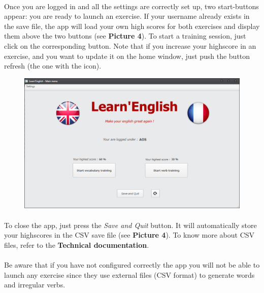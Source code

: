 \documentclass[12pt, a4paper]{report}
\begin{document}
\paragraph{}Once you are logged in and all the settings are correctly set up, two start-buttons appear: you are ready to launch an exercise. If your username already exists in the save file, the app will load your own high scores for both exercises and display them above the two buttons (see \textbf{Picture 4}). To start a training session, just click on the corresponding button. Note that if you increase your highscore in an exercise, and you want to update it on the home window, just push the button refresh (the one with the icon).
\begin{figure}[H]
    \centering
    \includegraphics[scale=0.55]{images/homelogged.png}
\end{figure}


\paragraph{}To close the app, just press the \textit{Save and Quit} button. It will automatically store your highscores in the CSV save file (see \textbf{Picture 4}). To know more about CSV files, refer to the \textbf{Technical documentation}.

\paragraph{}Be aware that if you have not configured correctly the app you will not be able to launch any exercise since they use external files (CSV format) to generate words and irregular verbs.


\newpage
\end{document}
